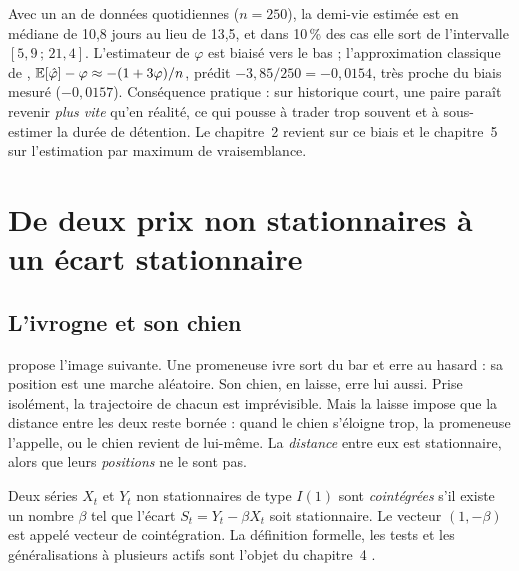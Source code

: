 \documentclass[11pt,a4paper]{article}
\begin{document}
\begin{pitfall}
Avec un an de données quotidiennes ($n = 250$), la demi-vie estimée est en médiane de 10,8 jours au lieu de 13,5, et dans 10\,\% des cas elle sort de l'intervalle $[5{,}9\,;\,21{,}4]$. L'estimateur de $\varphi$ est biaisé vers le bas ; l'approximation classique de \citet{kendall1954}, $\mathbb{E}[\hat\varphi]-\varphi \approx -(1+3\varphi)/n$, prédit $-3{,}85/250 = -0{,}0154$, très proche du biais mesuré ($-0{,}0157$). Conséquence pratique : sur historique court, une paire paraît revenir \emph{plus vite} qu'en réalité, ce qui pousse à trader trop souvent et à sous-estimer la durée de détention. Le chapitre~2 revient sur ce biais et le chapitre~5 sur l'estimation par maximum de vraisemblance.
\end{pitfall}

\section{De deux prix non stationnaires à un écart stationnaire}\label{sec:coint}

\subsection{L'ivrogne et son chien}

\citet{murray1994} propose l'image suivante. Une promeneuse ivre sort du bar et erre au hasard : sa position est une marche aléatoire. Son chien, en laisse, erre lui aussi. Prise isolément, la trajectoire de chacun est imprévisible. Mais la laisse impose que la distance entre les deux reste bornée : quand le chien s'éloigne trop, la promeneuse l'appelle, ou le chien revient de lui-même. La \emph{distance} entre eux est stationnaire, alors que leurs \emph{positions} ne le sont pas.

\begin{definition}
Deux séries $X_t$ et $Y_t$ non stationnaires de type $I(1)$ sont \emph{cointégrées} s'il existe un nombre $\beta$ tel que l'écart $S_t = Y_t - \beta X_t$ soit stationnaire. Le vecteur $(1,-\beta)$ est appelé vecteur de cointégration. La définition formelle, les tests et les généralisations à plusieurs actifs sont l'objet du chapitre~4 \citep{englegranger1987,johansen1991}.
\end{definition}
\end{document}
